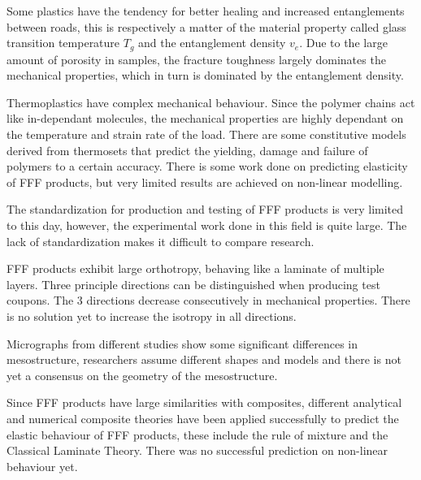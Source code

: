 Some plastics have the tendency for better healing and increased entanglements between roads, this is respectively a matter of the material property called glass transition temperature $T_g$ and the entanglement density $v_e$. Due to the large amount of porosity in samples, the fracture toughness largely dominates the mechanical properties, which in turn is dominated by the entanglement density.

Thermoplastics have complex mechanical behaviour. Since the polymer chains act like in-dependant molecules, the mechanical properties are highly dependant on the temperature and strain rate of the load. There are some constitutive models derived from thermosets that predict the yielding, damage and failure of polymers to a certain accuracy. There is some work done on predicting elasticity of FFF products, but very limited results are achieved on non-linear modelling. 

The standardization for production and testing of FFF products is very limited to this day, however, the experimental work done in this field is quite large. The lack of standardization makes it difficult to compare research. 

FFF products exhibit large orthotropy, behaving like a laminate of multiple layers. Three principle directions can be distinguished when producing test coupons. The 3 directions decrease consecutively in mechanical properties. There is no solution yet to increase the isotropy in all directions. 

Micrographs from different studies show some significant differences in mesostructure, researchers assume different shapes and models and there is not yet a consensus on the geometry of the mesostructure. 

Since FFF products have large similarities with composites, different analytical and numerical composite theories have been applied successfully to predict the elastic behaviour of FFF products, these include the rule of mixture and the Classical Laminate Theory. There was no successful prediction on non-linear behaviour yet. 


